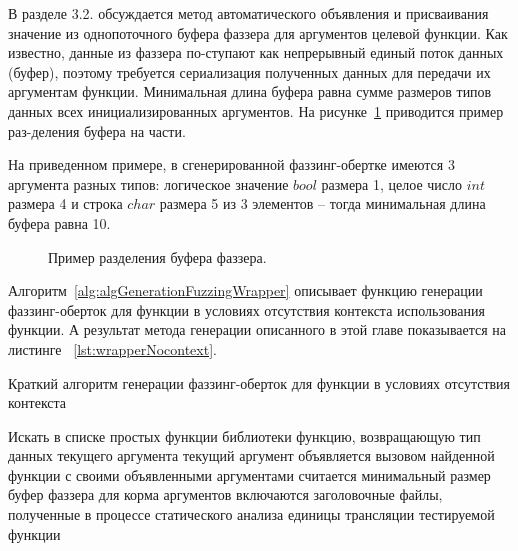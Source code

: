 В разделе 3.2. обсуждается метод автоматического объявления и присваивания значение из однопоточного буфера фаззера для аргументов целевой функции.
Как известно, данные из фаззера по-ступают как непрерывный единый поток данных (буфер), поэтому требуется сериализация полученных данных для передачи их аргументам функции. Минимальная длина буфера равна сумме размеров типов данных всех инициализированных аргументов. На рисунке~\cref{fig:sliceBuffer} приводится пример раз-деления буфера на части.

На приведенном примере, в сгенерированной фаззинг-обертке имеются 3 аргумента разных типов: логическое значение \(bool\) размера 1, целое число \(int\) размера 4 и строка \(char\) размера 5  из 3 элементов – тогда минимальная длина буфера равна 10.

\begin{figure}[ht]
    \caption{Пример разделения буфера фаззера.}\label{fig:sliceBuffer}
\end{figure}

Алгоритм~\cref{alg:algGenerationFuzzingWrapper} описывает функцию генерации фаззинг-оберток для функции в условиях отсутствия контекста использования функции. А результат метода генерации описанного в этой главе показывается на листинге ~\cref{lst:wrapperNocontext}. 

\begin{algorithm}
    \caption{Краткий алгоритм генерации фаззинг-оберток для функции в условиях отсутствия контекста}\label{alg:algGenerationFuzzingWrapper}
    \begin{algorithmic}[1]
                \Else
                    \Loop
                        \State Искать в списке простых функции библиотеки функцию, возвращающую тип данных текущего аргумента
                            \State текущий аргумент объявляется вызовом найденной функции с своими объявленными аргументами
                        \EndIf
                    \EndLoop
                \EndIf
            \EndFor
            \State считается минимальный размер буфер фаззера для корма аргументов
            \State включаются заголовочные файлы, полученные в процессе статического анализа единицы трансляции тестируемой функции
    \EndFunction
        \end{algorithmic}
\end{algorithm}

